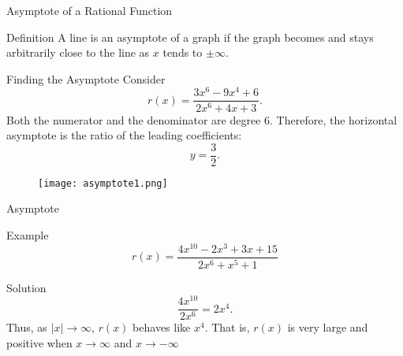 \begin{frame}{Asymptote of a Rational Function}
  \begin{block}{Definition}
    A line is an asymptote of a graph if the graph becomes and stays arbitrarily close to the line as \(x\) tends to \(\pm\infty\).
  \end{block}
  \vspace{0.5em}
  \begin{exampleblock}{Finding the Asymptote}
    Consider
    \[
      r(x)=\frac{3x^6-9x^4+6}{2x^6+4x+3}.
    \]
    Both the numerator and the denominator are degree 6. Therefore, the horizontal asymptote is the ratio of the leading coefficients:
    \[
      y=\frac{3}{2}.
    \]
  \end{exampleblock}
\end{frame}
\begin{frame}
  \begin{figure}
    \centering
    \texttt{[image: asymptote1.png]}
  \end{figure}
\end{frame}

\begin{frame}{Asymptote}
  \begin{exampleblock}{Example}
    \[
      r(x) = \frac{4x^{10}-2x^3+3x+15}{2x^6+x^5+1}
    \]
  \end{exampleblock}
  \begin{block}{Solution}
    \[
      \frac{4x^{10}}{2x^6} = 2x^4.
    \]
    Thus, as \(|x|\to\infty\), \(r(x)\) behaves like \(x^{4}\). That is, \(r(x)\) is very large and positive when \( x \to \infty\) and \( x \to -\infty\) 
  \end{block}
\end{frame}


